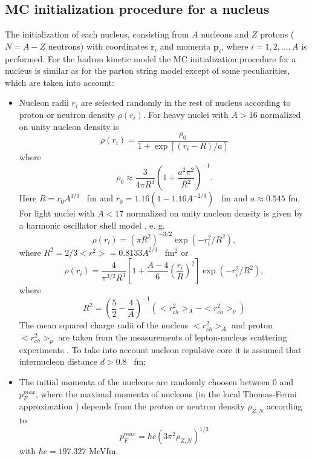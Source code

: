 \subsection{MC initialization procedure for a nucleus}
\hspace{1.0em}The initialization of each nucleus, consisting from $A$
nucleons and $Z$ protons ($N=A-Z$ neutrons) 
with coordinates $\mathbf{r}_i$ and momenta
$\mathbf{p}_i$, where $i = 1,2,...,A$ is performed.
For the hadron kinetic model the MC initialization procedure for a nucleus is 
similar as for the 
parton string model except of some peculiarities, which are taken into 
account:
\begin{itemize}
\item Nucleon radii $r_i$ are selected randomly in the rest of nucleus according 
to proton or neutron density $\rho(r_i)$. 
For heavy nuclei with $A > 16$ \cite{GLMP91} normalized on unity 
nucleon density is
\begin{equation}
\label{KNIS1}\rho(r_i) = 
 \frac{\rho_0}{1 + \exp{[(r_i - R)/a]}}
\end{equation}
where
\begin{equation}
\label{KNIS2}\rho_0 \approx \frac{3}{4\pi R^3}(1+\frac{a^2\pi^2}{R^2})^{-1}.
\end{equation} 
Here $R=r_0 A^{1/3}$ \ fm and $r_0=1.16(1-1.16A^{-2/3})$ \ fm and $a
\approx 0.545$ fm.  For light nuclei with $A < 17$ normalized on unity 
nucleon density is
given by a harmonic oscillator shell model \cite{Elton61}, e. g.
\begin{equation}
\label{KNIS3} \rho(r_i) = (\pi R^2)^{-3/2}\exp{(-r_i^2/R^2)},
\end{equation}
where $R^2 = 2/3<r^2> = 0.8133 A^{2/3}$ \ fm$^2$ or 
\begin{equation}
\label{KNIS4} \rho(r_i) =
\frac{4}{\pi^{3/2}R^3}[1+\frac{A-4}{6}(\frac{r_i}{R})^2]
\exp{(-r_i^2/R^2)},
\end{equation}
where
\begin{equation}
\label{KNIS5} R^2=(\frac{5}{2}-\frac{4}{A})^{-1}(<r^2_{ch}>_{A}- 
<r^2_{ch}>_{p})
\end{equation}
The mean squared charge radii of the nucleus $<r^2_{ch}>_{A}$ and proton
$<r^2_{ch}>_{p}$ are taken from the measurements of lepton-nucleus
scattering experiments \cite{BJ77}.  To take into account nucleon
repulsive core it is assumed that internucleon distance $d > 0.8$ \ fm;

\item The initial momenta of the nucleons are randomly choosen between $0$ and 
$p^{max}_F$, where 
the maximal momenta of nucleons (in the local Thomas-Fermi 
approximation \cite{DF74}) depends from
the proton or neutron density $\rho_{Z,N}$ according to 
\begin{equation}
\label{KNIS6} p^{max}_F = \hbar c(3\pi^2 \rho_{Z,N})^{1/3}
\end{equation}
with $\hbar c = 197.327$ MeVfm. 


\end{itemize}
